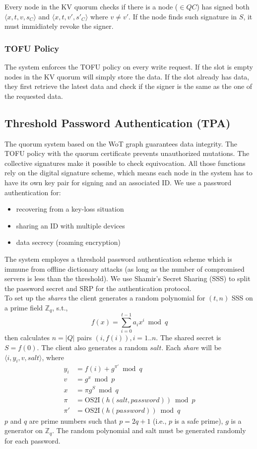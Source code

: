 Every node in the KV quorum checks if there is a node ($\in QC$) has
signed both $\langle x, t, v, s_C \rangle$ and $\langle x, t, v', s'_C
\rangle$ where $v \neq v'$.
If the node finds such signature in $S$, it must immidiately revoke
the signer.

\subsubsection*{TOFU Policy}
The system enforces the TOFU policy on every write request. If the
slot is empty nodes in the KV quorum will simply store the data. If
the slot already has data, they first retrieve the latest data and
check if the signer is the same as the one of the requested data.

\subsection{Threshold Password Authentication (TPA)}
\label{threshold}
The quorum system based on the WoT graph guarantees data
integrity. The TOFU policy with the quorum certificate prevents
unauthorized mutations. The collective signatures make it possible to
check equivocation. All those functions rely on the digital signature
scheme, which means each node in the system has to have its own key
pair for signing and an associated ID. We use a password
authentication for:
\begin{itemize}
\item recovering from a key-loss situation
\item sharing an ID with multiple devices
\item data secrecy (roaming encryption)
\end{itemize}

The system employes a threshold password authentication scheme which
is immune from offline dictionary attacks (as long as the number of
compromised servers is less than the threshold). We use Shamir's
Secret Sharing (SSS) to split the password secret and SRP \cite{srp}
for the authentication protocol.\\

To set up the {\em shares} the client generates a random polynomial
for $(t, n)$ SSS on a prime field $\mathbb{Z}_q$, s.t.,
\[
  f(x) = \sum_{i=0}^{t-1}a_ix^i \bmod q
\]
then calculates $n=|Q|$ pairs $(i,f(i)), i = 1..n$. The shared secret
is $S = f(0)$. The client also generates a random $salt$. Each {\em
share} will be $\langle i, y_i, v, salt \rangle$, where
\begin{align*}
  y_i &= f(i) + g^{\pi'} \bmod q \\
  v &= g^x \bmod p \\
  x &= \pi g^S \bmod q \\
  \pi &= \text{OS2I}(h(salt, password)) \bmod p \\
  \pi' &= \text{OS2I}(h(password)) \bmod q
\end{align*}
$p$ and $q$ are prime numbers such that $p = 2q + 1$ (i.e., $p$ is a
safe prime), $g$ is a generator on $\mathbb{Z}_q$. The random
polynomial and salt must be generated randomly for each password.\\

